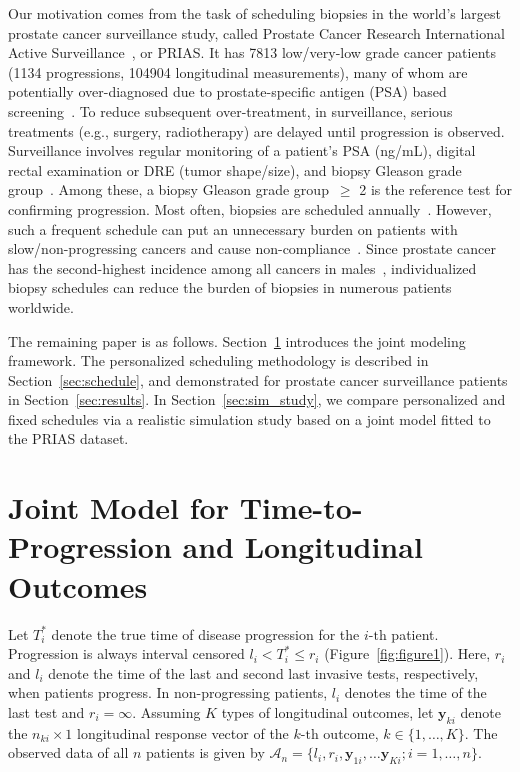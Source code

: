 \documentclass[AMA,STIX1COL]{WileyNJD-v2}
\begin{document}
Our motivation comes from the task of scheduling biopsies in the world's largest prostate cancer surveillance study, called Prostate Cancer Research International Active Surveillance~\citep{bokhorst2015compliance}, or PRIAS. It has 7813 low/very-low grade cancer patients (1134 progressions, 104904 longitudinal measurements), many of whom are potentially over-diagnosed due to prostate-specific antigen (PSA) based screening~\citep{loeb2014overdiagnosis}. To reduce subsequent over-treatment, in surveillance, serious treatments (e.g., surgery, radiotherapy) are delayed until progression is observed. Surveillance involves regular monitoring of a patient's PSA (ng/mL), digital rectal examination or DRE (tumor shape/size), and biopsy Gleason grade group~\citep{epsteinGG2014}. Among these, a biopsy Gleason grade group~$\geq$ 2 is the reference test for confirming progression. Most often, biopsies are scheduled annually~\citep{loeb2014heterogeneity}. However, such a frequent schedule can put an unnecessary burden on patients with slow/non-progressing cancers and cause non-compliance~\citep{bokhorst2015compliance}. Since prostate cancer has the second-highest incidence among all cancers in males~\citep{GlobalCancerStats2012}, individualized biopsy schedules can reduce the burden of biopsies in numerous patients worldwide.

The remaining paper is as follows. Section~\ref{sec:jointmodel} introduces the joint modeling framework. The personalized scheduling methodology is described in Section~\ref{sec:schedule}, and demonstrated for prostate cancer surveillance patients in Section~\ref{sec:results}. In Section~\ref{sec:sim_study}, we compare personalized and fixed schedules via a realistic simulation study based on a joint model fitted to the PRIAS dataset.


\section{Joint Model for Time-to-Progression and Longitudinal Outcomes}
\label{sec:jointmodel}
Let $T_i^*$ denote the true time of disease progression for the ${i\mbox{-th}}$ patient. Progression is always interval censored ${l_i < T_i^* \leq r_i}$ (Figure~\ref{fig:figure1}). Here, $r_i$ and $l_i$ denote the time of the last and second last invasive tests, respectively, when patients progress. In non-progressing patients, $l_i$ denotes the time of the last test and ${r_i=\infty}$. Assuming $K$ types of longitudinal outcomes, let $\boldsymbol{y}_{ki}$ denote the ${n_{ki} \times 1}$ longitudinal response vector of the ${k\mbox{-th}}$ outcome, $k \in \{1, \ldots, K\}$. The observed data of all $n$ patients is given by ${\mathcal{A}_n = \{l_i, r_i, \boldsymbol{y}_{1i},\ldots \boldsymbol{y}_{Ki}; i = 1, \ldots, n\}}$.
\end{document}
